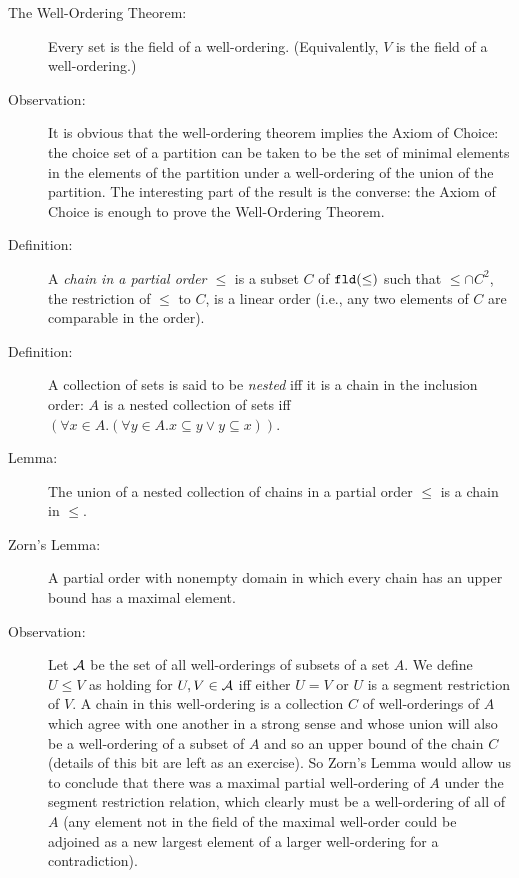\documentclass[12pt]{book}
\begin{document}
\begin{description}

\item[The Well-Ordering Theorem:] Every set is the field of a
well-ordering.  (Equivalently, $V$ is the field of a well-ordering.)

\item[Observation:] It is obvious that the well-ordering theorem
implies the Axiom of Choice: the choice set of a partition can be
taken to be the set of minimal elements in the elements of the
partition under a well-ordering of the union of the partition.  The
interesting part of the result is the converse: the Axiom of Choice is
enough to prove the Well-Ordering Theorem.

\item[Definition:] A {\em chain in a partial order $\leq$\/} is a subset
$C$ of ${\tt fld}(\leq)$ such that $\leq\cap C^2$, the restriction of
$\leq$ to $C$, is a linear order (i.e., any two elements of $C$ are
comparable in the order).

\item[Definition:] A collection of sets is said to be
{\em nested\/} iff it is a chain in the inclusion order: $A$ is a nested
collection of sets iff $(\forall x \in A.(\forall y \in A.x\subseteq y
\vee y \subseteq x))$.

\item[Lemma:] The union of a nested collection of chains in a partial
order $\leq$ is a chain in $\leq$.

\item[Zorn's Lemma:] A partial order with nonempty domain in which
every chain has an upper bound has a maximal element.

\item[Observation:] Let $\cal A$ be the set of all well-orderings of
subsets of a set $A$.  We define $U \leq V$ as holding for $U,V \in
{\cal A}$ iff either $U=V$ or $U$ is a segment restriction of $V$.  A
chain in this well-ordering is a collection $C$ of well-orderings of
$A$ which agree with one another in a strong sense and whose union
will also be a well-ordering of a subset of $A$ and so an upper bound
of the chain $C$ (details of this bit are left as an exercise).  So
Zorn's Lemma would allow us to conclude that there was a maximal
partial well-ordering of $A$ under the segment restriction relation,
which clearly must be a well-ordering of all of $A$ (any element not
in the field of the maximal well-order could be adjoined as a new
largest element of a larger well-ordering for a contradiction).


\end{description}
\end{document}
